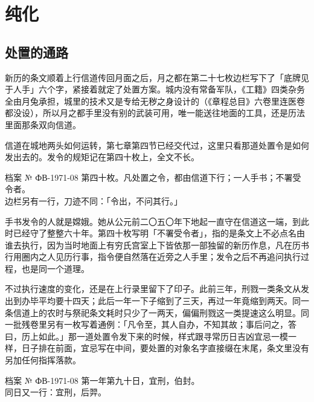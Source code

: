 \chapter{纯化}


\section{处置的通路}

新历的条文顺着上行信道传回月面之后，月之都在第二十七枚边栏写下了「底牌见于人手」六个字，紧接着就定了处置方案。城内没有常备军队，《工籍》四类杂务全由月兔承担，城里的技术又是专给无秽之身设计的（《章程总目》六卷里连医卷都没设），所以月之都手里没有别的武装可用，唯一能送往地面的工具，还是历法里面那条双向信道。

信道在城地两头如何运转，第七章第四节已经交代过，这里只看那道处置令是如何发出去的。发令的规矩记在第四十枚上，全文不长。

\begin{archive}[内部参考]{档案 № ФВ-1971-08}
第四十枚。凡处置之令，都由信道下行；一人手书；不署受令者。\\
边栏另有一行，刀迹不同：「令出，不问其行。」
\end{archive}

手书发令的人就是嫦娥。她从公元前二〇五〇年下地起一直守在信道这一端，到此时已经守了整整六十年。第四十枚写明「不署受令者」，指的是条文上不必点名由谁去执行，因为当时地面上有穷氏宫室上下皆依那一部独留的新历作息，凡在历书行用圈内之人见历行事，指令便自然落在近旁之人手里；发令之后不再追问执行过程，也是同一个道理。

不过执行速度的变化，还是在上行录里留下了印子。此前三年，刑戮一类条文从发出到办毕平均要十四天；此后一年一下子缩到了三天，再过一年竟缩到两天。同一条信道上的农时与祭祀条文耗时只少了一两天，偏偏刑戮这一类提速这么明显。同一批残卷里另有一枚写着通例：「凡令至，其人自办，不知其故；事后问之，答曰，历上如此。」那一道处置令发下来的时候，样式跟寻常历日吉凶宜忌一模一样，日子排在前面，宜忌写在中间，要处置的对象名字直接缀在末尾，条文里没有另加任何指挥落款。

\begin{archive}[内部参考]{档案 № ФВ-1971-08}
第一年第九十日，宜刑，伯封。\\
同日又一行：宜刑，后羿。
\end{archive}

